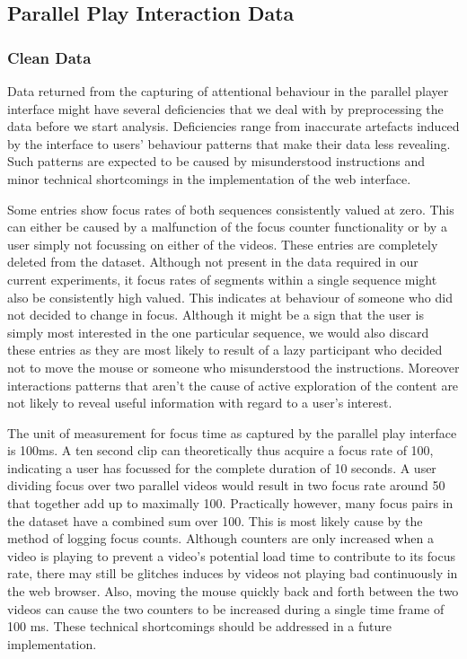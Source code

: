 \subsection{Parallel Play Interaction Data} %
\label{sub:parallel_play_interaction_data}

\subsubsection{Clean Data} %

Data returned from the capturing of attentional behaviour in the parallel player interface might have several deficiencies that we deal with by preprocessing the data before we start analysis. Deficiencies range from inaccurate artefacts induced by the interface to users' behaviour patterns that make their data less revealing. Such patterns are expected to be caused by misunderstood instructions and minor technical shortcomings in the implementation of the web interface.

Some entries show focus rates of both sequences consistently valued at zero. This can either be caused by a malfunction of the focus counter functionality or by a user simply not focussing on either of the videos. These entries are completely deleted from the dataset. Although not present in the data required in our current experiments, it focus rates of segments within a single sequence might also be consistently high valued. This indicates at behaviour of someone who did not decided to change in focus. Although it might be a sign that the user is simply most interested in the one particular sequence, we would also discard these entries as they are most likely to result of a lazy participant who decided not to move the mouse or someone who misunderstood the instructions. Moreover interactions patterns that aren't the cause of active exploration of the content are not likely to reveal useful information with regard to a user's interest.

The unit of measurement for focus time as captured by the parallel play interface is 100ms. A ten second clip can theoretically thus acquire a focus rate of 100, indicating a user has focussed for the complete duration of 10 seconds. A user dividing focus over two parallel videos would result in two focus rate around 50 that together add up to maximally 100. Practically however, many focus pairs in the dataset have a combined sum over 100. This is most likely cause by the method of logging focus counts. Although counters are only increased when a video is playing to prevent a video's potential load time to contribute to its focus rate, there may still be glitches induces by videos not playing bad continuously in the web browser. Also, moving the mouse quickly back and forth between the two videos can cause the two counters to be increased during a single time frame of 100 ms. These technical shortcomings should be addressed in a future implementation. 

